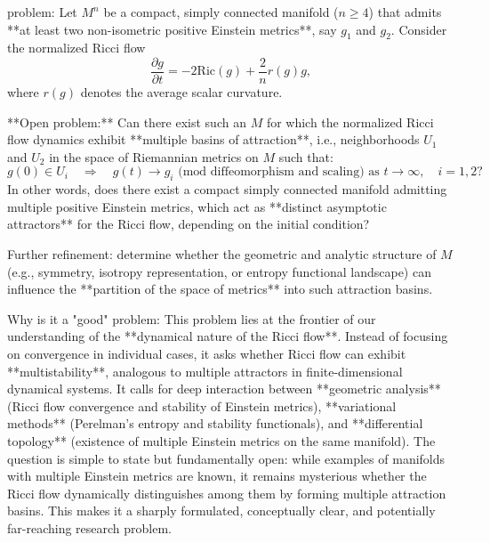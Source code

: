 problem:  
Let \(M^n\) be a compact, simply connected manifold (\(n \ge 4\)) that admits **at least two non-isometric positive Einstein metrics**, say \(g_1\) and \(g_2\). Consider the normalized Ricci flow
\[
\frac{\partial g}{\partial t} = -2\text{Ric}(g) + \frac{2}{n} r(g) g,
\]
where \(r(g)\) denotes the average scalar curvature.  

**Open problem:**  
Can there exist such an \(M\) for which the normalized Ricci flow dynamics exhibit **multiple basins of attraction**, i.e., neighborhoods \(U_1\) and \(U_2\) in the space of Riemannian metrics on \(M\) such that:
\[
g(0) \in U_i \quad \Rightarrow \quad g(t) \to g_i \text{ (mod diffeomorphism and scaling) as } t \to \infty, \quad i=1,2?
\]
In other words, does there exist a compact simply connected manifold admitting multiple positive Einstein metrics, which act as **distinct asymptotic attractors** for the Ricci flow, depending on the initial condition?  

Further refinement: determine whether the geometric and analytic structure of \(M\) (e.g., symmetry, isotropy representation, or entropy functional landscape) can influence the **partition of the space of metrics** into such attraction basins.

Why is it a "good" problem:  
This problem lies at the frontier of our understanding of the **dynamical nature of the Ricci flow**. Instead of focusing on convergence in individual cases, it asks whether Ricci flow can exhibit **multistability**, analogous to multiple attractors in finite-dimensional dynamical systems. It calls for deep interaction between **geometric analysis** (Ricci flow convergence and stability of Einstein metrics), **variational methods** (Perelman’s entropy and stability functionals), and **differential topology** (existence of multiple Einstein metrics on the same manifold). The question is simple to state but fundamentally open: while examples of manifolds with multiple Einstein metrics are known, it remains mysterious whether the Ricci flow dynamically distinguishes among them by forming multiple attraction basins. This makes it a sharply formulated, conceptually clear, and potentially far-reaching research problem.